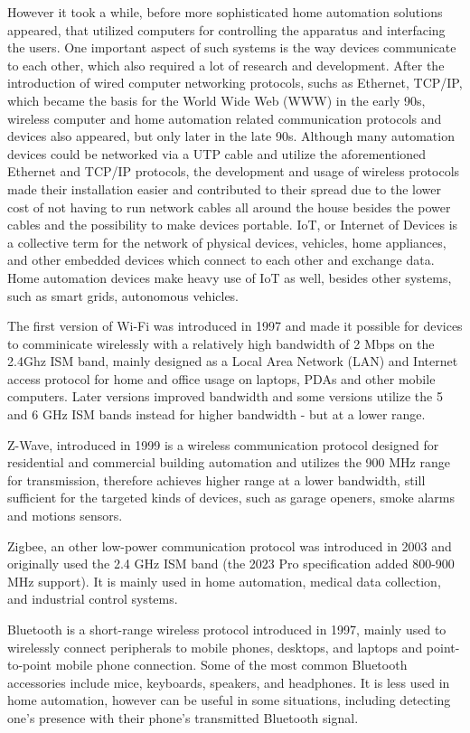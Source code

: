 However it took a while, before more sophisticated home automation solutions appeared, that utilized computers for controlling the apparatus and interfacing the users. One important aspect of such systems is the way devices communicate to each other, which also required a lot of research and development.
After the introduction of wired computer networking protocols, suchs as Ethernet, TCP/IP, which became the basis for the World Wide Web (WWW) in the early 90s, wireless computer and home automation related communication protocols and devices also appeared, but only later in the late 90s.
Although many automation devices could be networked via a UTP cable and utilize the aforementioned Ethernet and TCP/IP protocols, the development and usage of wireless protocols made their installation easier and contributed to their spread due to the lower cost of not having to run network cables all around the house besides the power cables and the possibility to make devices portable. IoT, or Internet of Devices is a collective term for the network of physical devices, vehicles, home appliances, and other embedded devices which connect to each other and exchange data. \cite{ShafiqIoTAttacks} Home automation devices make heavy use of IoT as well, besides other systems, such as smart grids, autonomous vehicles.\break

The first version of Wi-Fi was introduced in 1997 and made it possible for devices to comminicate wirelessly with a relatively high bandwidth of 2 Mbps on the 2.4Ghz ISM band, mainly designed as a Local Area Network (LAN) and Internet access protocol for home and office usage on laptops, PDAs and other mobile computers. Later versions improved bandwidth and some versions utilize the 5 and 6 GHz ISM bands instead for higher bandwidth - but at a lower range. \cite{IEEEWiFi}\break

Z-Wave, introduced in 1999 is a wireless communication protocol designed for residential and commercial building automation and utilizes the 900 MHz range for transmission, therefore achieves higher range at a lower bandwidth, still sufficient for the targeted kinds of devices, such as garage openers, smoke alarms and motions sensors. \cite{PCMagZWave}\break

Zigbee, an other low-power communication protocol was introduced in 2003 and originally used the 2.4 GHz ISM band (the 2023 Pro specification added 800-900 MHz support). It is mainly used in home automation, medical data collection, and industrial control systems.

Bluetooth is a short-range wireless protocol introduced in 1997, mainly used to wirelessly connect peripherals to mobile phones, desktops, and laptops and point-to-point mobile phone connection. \cite{IntelBluetooth} Some of the most common Bluetooth accessories include mice, keyboards, speakers, and headphones. It is less used in home automation, however can be useful in some situations, including detecting one's presence with their phone's transmitted Bluetooth signal.\break%

